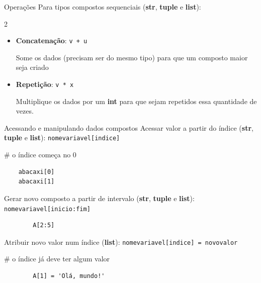\begin{frame}{Operações}
	Para tipos compostos sequenciais 
	(\textbf{str}, \textbf{tuple} e \textbf{list}):
	\begin{multicols}{2}
		\begin{itemize}	
			\item \textbf{Concatenação}: 
				\texttt{v + u} 
				
			Some os dados (precisam ser do mesmo tipo) para que um composto maior seja criado 	
			
			\item \textbf{Repetição}: 
				\texttt{v * x}									
				
			Multiplique os dados por um \textbf{int} para que sejam repetidos essa quantidade de vezes.	
		\end{itemize}				
	\end{multicols}	
 \end{frame}

\begin{frame}[containsverbatim]{Acessando e manipulando dados compostos} 
	Acessar valor a partir do índice 
	(\textbf{str}, \textbf{tuple} e \textbf{list}):
	\texttt{nomevariavel[indice]}
	
	\# o índice começa no 0
	
\begin{verbatim}
	abacaxi[0]
	abacaxi[1]
\end{verbatim}	
	
  \end{frame}	

\begin{frame}[containsverbatim]
	Gerar novo composto a partir de intervalo
	(\textbf{str}, \textbf{tuple} e \textbf{list}):
	\texttt{nomevariavel[inicio:fim]}
	
	\begin{verbatim}
		A[2:5]	
	\end{verbatim}
\end{frame}

\begin{frame}[containsverbatim]
	Atribuir novo valor num índice 
	(\textbf{list}):
	\texttt{nomevariavel[indice] = novovalor}
	
	\# o índice já deve ter algum valor
	
	\begin{verbatim}
		A[1] = 'Olá, mundo!' 	
	\end{verbatim}	
\end{frame}


